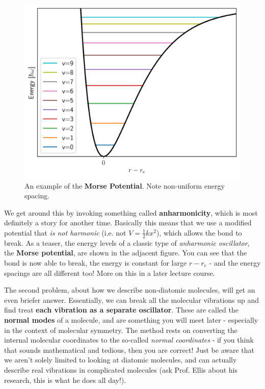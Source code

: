 \documentclass{memoir}[11pt,oneside,a4paper,openany]
\begin{document}
\begin{figure}
\centering
	\includegraphics[width=\linewidth]{morse_potential}
	\caption{An example of the \textbf{Morse Potential}. Note non-uniform energy spacing.}
\end{figure}
We get around this by invoking something called \textbf{anharmonicity}, which is most definitely a story for another time. Basically this means that we use a modified potential that \emph{is not harmonic} (i.e. not $V=\frac{1}{2}kx^2$), which allows the bond to break. As a teaser, the energy levels of a classic type of \emph{anharmonic oscillator}, the \textbf{Morse potential}, are shown in the adjacent figure. You can see that the bond is now able to break, the energy is constant for large $r-r_e$ - and the energy spacings are all different too! More on this in a later lecture course.

The second problem, about how we describe non-diatomic molecules, will get an even briefer answer. Essentially, we can break all the molecular vibrations up and find treat \textbf{each vibration as a separate oscillator}. These are called the \textbf{normal modes} of a molecule, and are something you will meet later - especially in the context of molecular symmetry. The method rests on converting the internal molecular coordinates to the so-called \emph{normal coordinates} - if you think that sounds mathematical and tedious, then you are correct! Just be aware that we aren't solely limited to looking at diatomic molecules, and can actually describe real vibrations in complicated molecules (ask Prof. Ellis about his research, this is what he does all day!).
\end{document}
